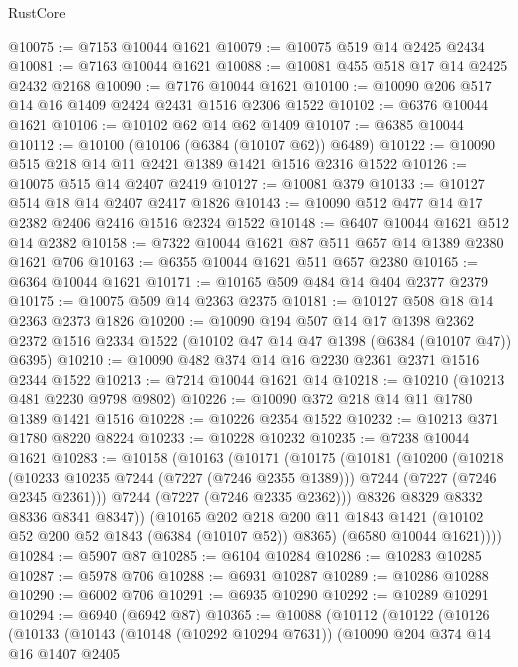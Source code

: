 \begin{lexlean}{RustCore}
\begin{coremodule}
@10075 := @7153 @10044 @1621
@10079 := @10075 @519 @14 @2425 @2434
@10081 := @7163 @10044 @1621
@10088 := @10081 @455 @518 @17 @14 @2425 @2432 @2168
@10090 := @7176 @10044 @1621
@10100 := @10090 @206 @517 @14 @16 @1409 @2424 @2431 @1516 @2306 @1522
@10102 := @6376 @10044 @1621
@10106 := @10102 @62 @14 @62 @1409
@10107 := @6385 @10044
@10112 := @10100 (@10106 (@6384 (@10107 @62)) @6489)
@10122 := @10090 @515 @218 @14 @11 @2421 @1389 @1421 @1516 @2316 @1522
@10126 := @10075 @515 @14 @2407 @2419
@10127 := @10081 @379
@10133 := @10127 @514 @18 @14 @2407 @2417 @1826
@10143 := @10090 @512 @477 @14 @17 @2382 @2406 @2416 @1516 @2324 @1522
@10148 := @6407 @10044 @1621 @512 @14 @2382
@10158 := @7322 @10044 @1621 @87 @511 @657 @14 @1389 @2380 @1621 @706
@10163 := @6355 @10044 @1621 @511 @657 @2380
@10165 := @6364 @10044 @1621
@10171 := @10165 @509 @484 @14 @404 @2377 @2379
@10175 := @10075 @509 @14 @2363 @2375
@10181 := @10127 @508 @18 @14 @2363 @2373 @1826
@10200 := @10090
    @194
    @507
    @14
    @17
    @1398
    @2362
    @2372
    @1516
    @2334
    @1522
    (@10102 @47 @14 @47 @1398 (@6384 (@10107 @47)) @6395)
@10210 := @10090 @482 @374 @14 @16 @2230 @2361 @2371 @1516 @2344 @1522
@10213 := @7214 @10044 @1621 @14
@10218 := @10210 (@10213 @481 @2230 @9798 @9802)
@10226 := @10090 @372 @218 @14 @11 @1780 @1389 @1421 @1516
@10228 := @10226 @2354 @1522
@10232 := @10213 @371 @1780 @8220 @8224
@10233 := @10228 @10232
@10235 := @7238 @10044 @1621
@10283 := @10158
    (@10163
      (@10171
        (@10175
          (@10181
            (@10200
              (@10218
                (@10233 @10235 @7244 (@7227 (@7246 @2355 @1389)))
                @7244
                (@7227 (@7246 @2345 @2361)))
              @7244
              (@7227 (@7246 @2335 @2362)))
            @8326
            @8329
            @8332
            @8336
            @8341
            @8347))
        (@10165
          @202
          @218
          @200
          @11
          @1843
          @1421
          (@10102 @52 @200 @52 @1843 (@6384 (@10107 @52)) @8365)
          (@6580 @10044 @1621))))
@10284 := @5907 @87
@10285 := @6104 @10284
@10286 := @10283 @10285
@10287 := @5978 @706
@10288 := @6931 @10287
@10289 := @10286 @10288
@10290 := @6002 @706
@10291 := @6935 @10290
@10292 := @10289 @10291
@10294 := @6940 (@6942 @87)
@10365 := @10088
    (@10112
      (@10122
        (@10126
          (@10133
            (@10143
              (@10148 (@10292 @10294 @7631))
              (@10090
                @204
                @374
                @14
                @16
                @1407
                @2405

\end{coremodule}
\end{lexlean}

